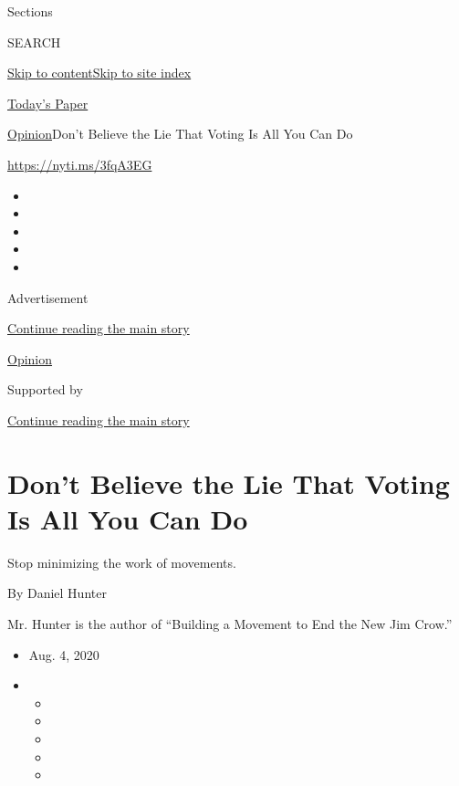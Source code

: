 Sections

SEARCH

\protect\hyperlink{site-content}{Skip to
content}\protect\hyperlink{site-index}{Skip to site index}

\href{https://myaccount.nytimes.com/auth/login?response_type=cookie\&client_id=vi}{}

\href{https://www.nytimes.com/section/todayspaper}{Today's Paper}

\href{/section/opinion}{Opinion}\textbar{}Don't Believe the Lie That
Voting Is All You Can Do

\url{https://nyti.ms/3fqA3EG}

\begin{itemize}
\item
\item
\item
\item
\item
\end{itemize}

Advertisement

\protect\hyperlink{after-top}{Continue reading the main story}

\href{/section/opinion}{Opinion}

Supported by

\protect\hyperlink{after-sponsor}{Continue reading the main story}

\hypertarget{dont-believe-the-lie-that-voting-is-all-you-can-do}{%
\section{Don't Believe the Lie That Voting Is All You Can
Do}\label{dont-believe-the-lie-that-voting-is-all-you-can-do}}

Stop minimizing the work of movements.

By Daniel Hunter

Mr. Hunter is the author of ``Building a Movement to End the New Jim
Crow.''

\begin{itemize}
\item
  Aug. 4, 2020
\item
  \begin{itemize}
  \item
  \item
  \item
  \item
  \item
  \end{itemize}
\end{itemize}

